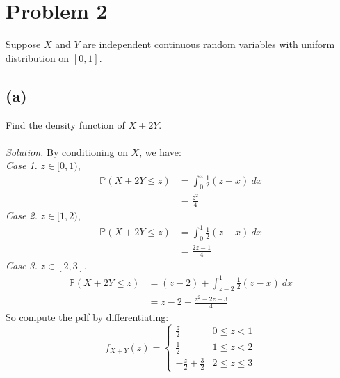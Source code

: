 \documentclass{article}
\begin{document}
\section*{Problem 2}
Suppose $X$ and $Y$ are independent continuous random variables with uniform distribution on $[0,1]$.
\subsection*{(a)}
Find the density function of $X+2Y$.\\
\\
\color{blue}
\textit{Solution.} By conditioning on $X$, we have:\\
\textit{Case 1.} $z\in [0,1)$,
\begin{equation*}
\begin{split}
    \mathbb{P}(X+2Y\leq z) &= \int_0^z \frac{1}{2}(z-x)\ dx\\
    &=\frac{z^2}{4}
\end{split}
\end{equation*}
\textit{Case 2.} $z \in [1,2)$,
\begin{equation*}
    \begin{split}
        \mathbb{P}(X+2Y\leq z) &= \int_0^1 \frac{1}{2}(z-x) \ dx\\
        &=\frac{2z-1}{4}
    \end{split}
\end{equation*}
\textit{Case 3.} $z \in [2,3]$,
\begin{equation*}
    \begin{split}
        \mathbb{P}(X+2Y\leq z) &= (z-2) + \int_{z-2}^1\frac{1}{2}(z-x) \ dx\\
        &= z-2-\frac{z^2-2z-3}{4}
    \end{split}
\end{equation*}
So  compute the pdf by differentiating:
\begin{equation*}
    f_{X+Y}(z) =
    \begin{cases}
        \frac{z}{2} & 0\leq z<1\\
        \frac{1}{2} & 1\leq z<2\\
        -\frac{z}{2}+\frac{3}{2} & 2\leq z \leq3
    \end{cases}
\end{equation*}
\color{black}
\end{document}
